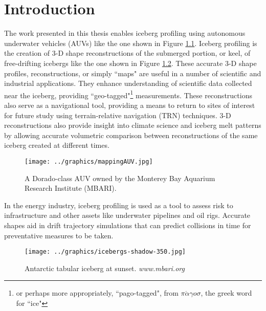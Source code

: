 
\chapter{Introduction}
\label{ch.Introduction}

The work presented in this thesis enables iceberg profiling using autonomous underwater vehicles (AUVs) like the one shown in Figure \ref{fig:AUVdorado1}. Iceberg profiling is the creation of 3-D shape reconstructions of the submerged portion, or keel, of free-drifting icebergs like the one shown in Figure \ref{fig:IcebergSunset}. These accurate 3-D shape profiles, reconstructions, or simply ``maps" are useful in a number of scientific and industrial applications. They enhance understanding of scientific data collected near the iceberg, providing ``geo-tagged"\footnote{or perhaps more appropriately, ``pago-tagged", from  $\pi \acute{\alpha} \gamma o \sigma$,  the greek word for ``ice"}  measurements. These reconstructions also serve as a navigational tool, providing a means to return to sites of interest for future study using terrain-relative navigation (TRN) techniques. 3-D reconstructions also provide insight into climate science and iceberg melt patterns by allowing accurate volumetric comparison between reconstructions of the same iceberg created at different times. 

\begin{figure}[htb]
   \centering
   \texttt{[image: ../graphics/mappingAUV.jpg]} %
   \caption{A Dorado-class AUV owned by the Monterey Bay Aquarium Research Institute (MBARI).}
   \label{fig:AUVdorado1}
\end{figure}

In the energy industry, iceberg profiling is used as a tool to assess risk to infrastructure and other assets like underwater pipelines and oil rigs. Accurate shapes aid in drift trajectory simulations that can predict collisions in time for preventative measures to be taken. 


\begin{figure}[!htb]
   \centering
   \texttt{[image: ../graphics/icebergs-shadow-350.jpg]} %
   \caption{Antarctic tabular iceberg at sunset. \emph{www.mbari.org}}
   \label{fig:IcebergSunset}
\end{figure}

